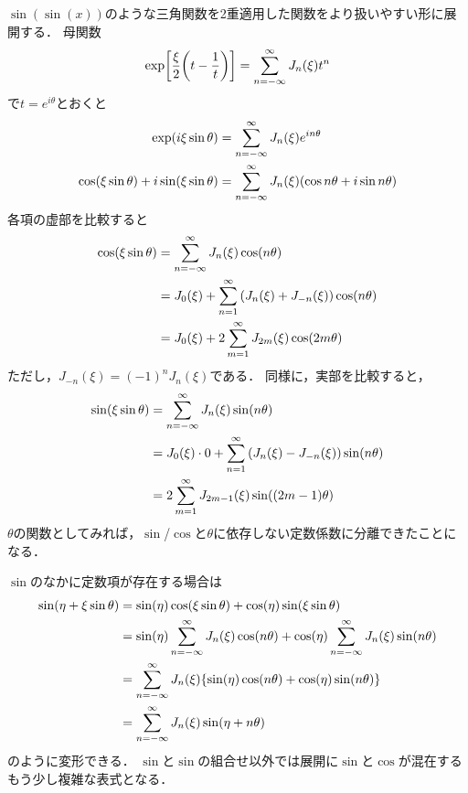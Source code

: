\documentclass[dvipdfmx,autodetect-engine,12pt,fleqn]{jsarticle}
\begin{document}
$\sin(\sin(x))$のような三角関数を2重適用した関数をより扱いやすい形に展開する．
母関数
\begin{equation*}
    \exp\sbra*{\frac{\xi}{2}\qty(t-\frac{1}{t})} = \sum_{n=-\infty}^\infty J_n(\xi)t^n
\end{equation*}
で$t=e^{i\theta}$とおくと
\begin{equation}
\begin{split}
    \exp\lparen i\xi \sin\theta\rparen &= \sum_{n=-\infty}^\infty J_n(\xi)e^{in\theta}\\
    \cos\lparen\xi \sin\theta\rparen+i\sin\lparen\xi \sin\theta\rparen &= \sum_{n=-\infty}^\infty J_n(\xi)\lparen\cos{n\theta}+i\sin{n\theta}\rparen
\end{split}
\end{equation}
各項の虚部を比較すると
\begin{equation}
\begin{split}
    \cos\rbra*{\xi \sin\theta} &= \sum_{n=-\infty}^\infty J_n(\xi)\cos\rbra{n\theta}\\
    &= J_0(\xi) + \sum_{n=1}^\infty \qty(J_n(\xi)+J_{-n}(\xi))\cos\rbra{n\theta}\\
    &= J_0(\xi) + 2\sum_{m=1}^\infty J_{2m}(\xi)\cos\rbra{2m\theta}
\end{split}
\end{equation}
ただし，$J_{-n}(\xi)=(-1)^nJ_n(\xi)$である．
同様に，実部を比較すると，
\begin{equation}
\begin{split}
    \sin\rbra*{\xi \sin\theta} &= \sum_{n=-\infty}^\infty J_n(\xi)\sin\rbra{n\theta}\\
    &= J_0(\xi)\cdot 0 + \sum_{n=1}^\infty \qty(J_n(\xi)-J_{-n}(\xi))\sin\rbra{n\theta}\\
    &= 2\sum_{m=1}^\infty J_{2m-1}(\xi)\sin\rbra{(2m-1)\theta}
\end{split}
\end{equation}
$\theta$の関数としてみれば，$\sin$/$\cos$と$\theta$に依存しない定数係数に分離できたことになる．

$\sin$のなかに定数項が存在する場合は
\begin{equation}
\label{eq:bessel-series-sinsin}
\begin{split}
    \sin\rbra*{\eta + \xi \sin\theta} &= \sin(\eta)\cos(\xi\sin\theta)+\cos(\eta)\sin(\xi\sin\theta)\\
    &= \sin(\eta)\sum_{n=-\infty}^\infty J_n(\xi)\cos(n\theta) + \cos(\eta)\sum_{n=-\infty}^\infty J_n(\xi)\sin(n\theta)\\
    &= \sum_{n=-\infty}^\infty J_n(\xi) \qty{\sin(\eta)\cos(n\theta) + \cos(\eta)\sin(n\theta)}\\
    &= \sum_{n=-\infty}^\infty J_n(\xi) \sin\rbra*{\eta + n\theta}
\end{split}
\end{equation}
のように変形できる．
$\sin$と$\sin$の組合せ以外では展開に$\sin$と$\cos$が混在するもう少し複雑な表式となる．
\end{document}
